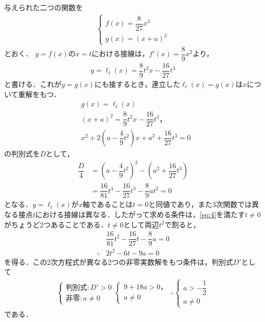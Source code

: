 \documentclass[../../main.tex]{subfiles}
\begin{document}
与えられた二つの関数を
\begin{align}
  \begin{cases}
    f(x)=\dfrac{8}{27}x^3 \\
    g(x)=(x+a)^2
  \end{cases} \label{eq:1}
\end{align}
とおく．
$y=f(x)$の$x=t$における接線は，$f'(x)=\dfrac{8}{9}x^2$より，
\begin{align}
  y=\ell_t(x)=\dfrac{8}{9}t^2x-\dfrac{16}{27}t^3 \label{eq:2}
\end{align}
と書ける．これが$y=g(x)$にも接するとき，連立した$\ell_t(x)=g(x)$は$x$について重解をもつ．
\begin{align}
  & g(x) = \ell_t(x) \\
  & (x+a)^2=\dfrac{8}{9}t^2x-\dfrac{16}{27}t^3，\\
  & x^2+2\left(a-\dfrac{4}{9}t^2\right)x+a^2+\dfrac{16}{27}t^3=0 \label{eq:3}
\end{align}
の判別式を$D$として，
\begin{align}
  \dfrac{D}{4}
  &=\left(a-\dfrac{4}{9}t^2\right)^2
  -\left(a^2+\dfrac{16}{27}t^3\right)\\
  &=\dfrac{16}{81}t^4-\dfrac{16}{27}t^3-\dfrac{8}{9}at^2=0 \label{eq:4}
\end{align}
となる．$y=\ell_t(x)$が$x$軸であることは$t=0$と同値であり，また3次関数では異なる接点$t$における接線は異なる．したがって求める条件は，\cref{eq:4}を満たす$t\ne 0$がちょうど2つあることである．$t\ne0$として両辺$t^2$で割ると，
\begin{align}
  & \dfrac{16}{81}t^2-\dfrac{16}{27}t-\dfrac{8}{9}a=0 \\
  \therefore
  & 2t^2-6t-9a=0 \label{eq:5}
\end{align}
を得る．この2次方程式が異なる2つの非零実数解をもつ条件は，判別式$D'$として
\begin{align}
  \begin{cases}
    \text{判別式}: D' > 0 \\
    \text{非零}: a \neq 0
  \end{cases}
  \begin{cases}
    9+18a>0，\\
    a\ne0
  \end{cases}
  \therefore
  \begin{cases}
    a>-\dfrac{1}{2} \\
    a\ne0
  \end{cases} \label{eq:6}
\end{align}
である．
\end{document}
